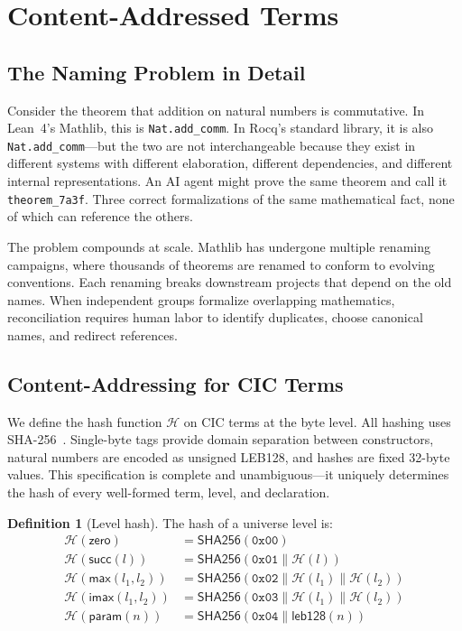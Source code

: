 \documentclass[11pt]{article}
\theoremstyle{definition}
\newtheorem{definition}{Definition}[section]
\theoremstyle{plain}
\theoremstyle{remark}
\newcommand{\hash}{\mathcal{H}}
\newcommand{\SHA}{\textsf{SHA256}}
\newcommand{\concat}{\mathbin{\|}}
\begin{document}
\section{Content-Addressed Terms}
\label{sec:content}

\subsection{The Naming Problem in Detail}
\label{sec:naming-problem}

Consider the theorem that addition on natural numbers is commutative.
In Lean~4's Mathlib, this is \texttt{Nat.add\_comm}.
In Rocq's standard library, it is also \texttt{Nat.add\_comm}---but the two are not interchangeable
because they exist in different systems with different elaboration, different dependencies, and
different internal representations.
An AI agent might prove the same theorem and call it \texttt{theorem\_7a3f}.
Three correct formalizations of the same mathematical fact, none of which can reference the others.

The problem compounds at scale.
Mathlib has undergone multiple renaming campaigns, where thousands of theorems are renamed
to conform to evolving conventions.
Each renaming breaks downstream projects that depend on the old names.
When independent groups formalize overlapping mathematics, reconciliation requires human labor
to identify duplicates, choose canonical names, and redirect references.

\subsection{Content-Addressing for CIC Terms}
\label{sec:hashing}

We define the hash function $\hash$ on CIC terms at the byte level.
All hashing uses SHA-256~\cite{sha256}.
Single-byte tags provide domain separation between constructors, natural numbers are
encoded as unsigned LEB128, and hashes are fixed 32-byte values.
This specification is complete and unambiguous---it uniquely determines the hash of
every well-formed term, level, and declaration.

\begin{definition}[Level hash]
\label{def:hash-level}
The hash of a universe level is:
\begin{align*}
  \hash(\textsf{zero}) &= \SHA(\mathtt{0x00}) \\
  \hash(\textsf{succ}(l)) &= \SHA(\mathtt{0x01} \concat \hash(l)) \\
  \hash(\textsf{max}(l_1, l_2)) &= \SHA(\mathtt{0x02} \concat \hash(l_1) \concat \hash(l_2)) \\
  \hash(\textsf{imax}(l_1, l_2)) &= \SHA(\mathtt{0x03} \concat \hash(l_1) \concat \hash(l_2)) \\
  \hash(\textsf{param}(n)) &= \SHA(\mathtt{0x04} \concat \textsf{leb128}(n))
\end{align*}
\end{definition}
\end{document}
